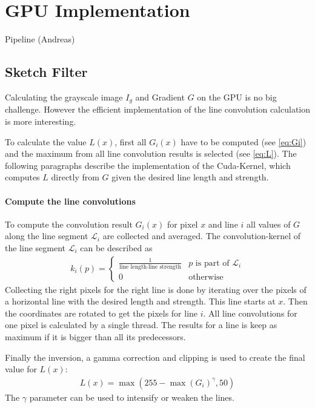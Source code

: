 \section{GPU Implementation} \label{gpu-implementation}
Pipeline (Andreas)

\subsection{Sketch Filter}
Calculating the grayscale image $I_g$ and Gradient $G$ on the GPU is no big
challenge. However the efficient implementation of the line convolution
calculation is more interesting.

To calculate the value $L(x)$, first all $G_i(x)$ have to
be computed (see \autoref{eq:Gi}) and the maximum from all line convolution
results is selected (see \autoref{eq:L}). The following paragraphs describe the
implementation of the Cuda-Kernel, which computes $L$ directly from $G$ given
the desired line length and strength.

\paragraph{Compute the line convolutions} 
To compute the convolution result $G_i(x)$ for pixel $x$ and line $i$ all values of $G$
along the line segment $\mathscr{L}_i$ are collected and averaged. The
convolution-kernel of the line segment $\mathscr{L}_i$ can be described as 
\begin{align*}
  k_i(p) = \begin{cases}
    \frac{1}{\text{line length} \cdot \text{line strength}} & p \text{ is part
    of } \mathscr{L}_i\\
    0 & \text{otherwise}
  \end{cases}
\end{align*}
Collecting the right pixels for the right line is done by iterating over the
pixels of a horizontal line with the desired length and strength. This line
starts at $x$. Then the coordinates are rotated to get the pixels for line $i$.
All line convolutions for one pixel is calculated by a single thread. The
results for a line is keep as maximum if it is bigger than all its predecessors. 

Finally the inversion, a gamma correction and clipping is used to create the
final value for $L(x)$:
\begin{align*}
  L(x) = \max(255 - \max(G_i)^{\gamma}, 50)
\end{align*}
The $\gamma$ parameter can be used to intensify or weaken the lines.


